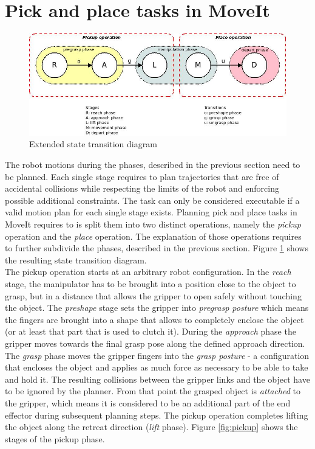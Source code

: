 \section{Pick and place tasks in MoveIt}

\begin{figure}[ht]
	\centering
  	\includegraphics[width=1.0\textwidth]{images/pick_place_states.jpg}
	\caption{Extended state transition diagram}
	\label{fig:pick_place_states}
\end{figure}

The robot motions during the phases, described in the previous section need to be planned. Each single stage requires to plan trajectories that are free of accidental collisions while respecting the limits of the robot and enforcing possible additional constraints. The task can only be considered executable if a valid motion plan for each single stage exists. Planning pick and place tasks in MoveIt requires to is split them into two distinct operations, namely the \emph{pickup} operation and the \emph{place} operation. The explanation of those operations requires to further subdivide the phases, described in the previous section. Figure \ref{fig:pick_place_states} shows the resulting state transition diagram.\\

The pickup operation starts at an arbitrary robot configuration. In the \emph{reach} stage, the manipulator has to be brought into a position close to the object to grasp, but in a distance that allows the gripper to open safely without touching the object. The \emph{preshape} stage sets the gripper into \emph{pregrasp posture} which means the fingers are brought into a shape that allows to completely enclose the object (or at least that part that is used to clutch it). During the \emph{approach} phase the gripper moves towards the final grasp pose along the defined approach direction. The \emph{grasp} phase moves the gripper fingers into the \emph{grasp posture} - a configuration that encloses the object and applies as much force as necessary to be able to take and hold it. The resulting collisions between the gripper links and the object have to be ignored by the planner. From that point the grasped object is \emph{attached} to the gripper, which means it is considered to be an additional part of the end effector during subsequent planning steps. The pickup operation completes lifting the object along the retreat direction (\emph{lift} phase). Figure \ref{fig:pickup} shows the stages of the pickup phase.

